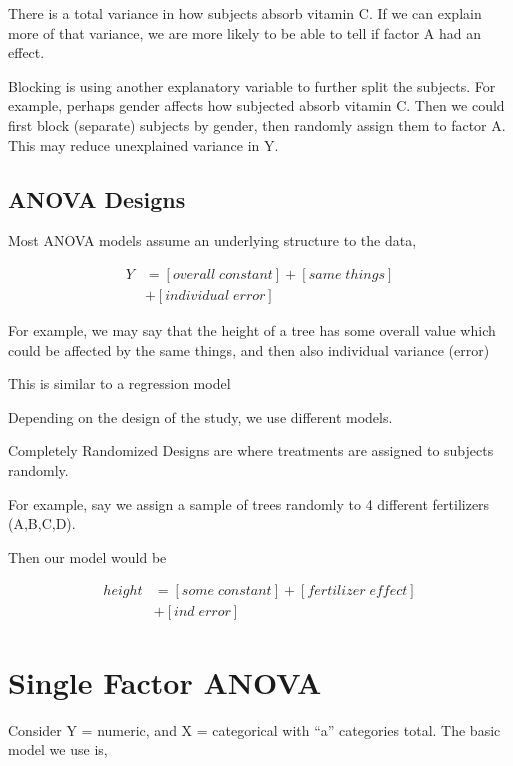 \documentclass[10pt]{article}
\newcommand{\define}[1]{\colorbox{Thistle2}{#1}}
\newcommand{\emphas}[1]{\colorbox{DarkSeaGreen2}{#1}}
\begin{document}
\begin{multicols}{3}
    There is a \emphas{total variance} in how subjects absorb vitamin C. If we can explain more of that variance, we are more likely to be able to tell if factor A had an effect.

    \define{Blocking} is using another explanatory variable to further split the subjects. For example, perhaps gender affects how subjected absorb vitamin C. Then we could first block (separate) subjects by gender, then randomly assign them to factor A. This may reduce unexplained variance in Y.

    \subsection{ANOVA Designs}

    Most ANOVA models assume an underlying structure to the data,

    \begin{align*}
        Y & = [overall \; constant] + [same \; things] \\
          & + [individual \; error]
    \end{align*}

    For example, we may say that the height of a tree has some \emphas{overall value} which could be affected by the \emphas{same things}, and then also \emphas{individual variance (error)}

    This is similar to a \emphas{regression model}

    Depending on the design of the study, we use different models.

    \define{Completely Randomized Designs} are where treatments are assigned to subjects randomly.

    For example, say we assign a sample of trees randomly to 4 different fertilizers (A,B,C,D).

    Then our model would be 

    \begin{align*}
        height & = [some \; constant] + [fertilizer \; effect] \\
                & + [ind \; error]
    \end{align*}

    \section{Single Factor ANOVA} 

    Consider Y = numeric, and X = categorical with ``a'' categories total. The basic model we use is,


\end{multicols}
\end{document}
